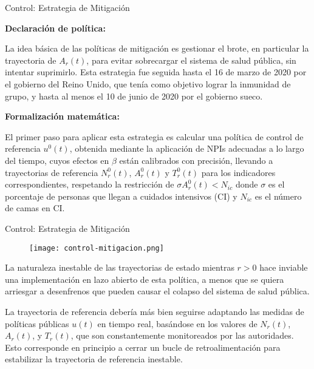 \documentclass{beamer}
\begin{document}
\begin{frame}{Control: Estrategia de Mitigación}
\begin{justify}
\small
\textbf{Declaración de política:}

\vspace{0.2cm}
La idea básica de las políticas de mitigación es gestionar el brote, en particular la trayectoria de \( A_r(t) \), para evitar sobrecargar el sistema de salud pública, sin intentar suprimirlo. Esta estrategia fue seguida hasta el 16 de marzo de 2020 por el gobierno del Reino Unido, que tenía como objetivo lograr la inmunidad de grupo, y hasta al menos el 10 de junio de 2020 por el gobierno sueco.

\vspace{0.3cm}
\textbf{Formalización matemática:}

\vspace{0.2cm}
El primer paso para aplicar esta estrategia es calcular una política de control de referencia \( u^0(t) \), obtenida mediante la aplicación de NPIs adecuadas a lo largo del tiempo, cuyos efectos en \( \beta \) están calibrados con precisión, llevando a trayectorias de referencia \( N_r^0(t) \), \( A_r^0(t) \) y \( T_r^0(t) \) para los indicadores correspondientes, respetando la restricción de \( \sigma A_r^0(t) < N_{ic} \) donde  $\sigma$ es el porcentaje de personas que llegan a cuidados intensivos (CI) y  $N_{ic}$ es el número de camas en CI. 


\end{justify}
\end{frame}

\begin{frame}{Control: Estrategia de Mitigación}
\begin{justify}
\small

\begin{figure}[H]
\centering
\texttt{[image: control-mitigacion.png]}
\captionsetup{justification=centering}
\label{C}
\end{figure}

La naturaleza inestable de las trayectorias de estado mientras \( r > 0 \) hace inviable una implementación en lazo abierto de esta política, a menos que se quiera arriesgar a desenfrenos que pueden causar el colapso del sistema de salud pública. 

\vspace{0.3cm}
La trayectoria de referencia debería más bien seguirse adaptando las medidas de políticas públicas \( u(t) \) en tiempo real, basándose en los valores de \( N_r(t) \), \( A_r(t) \), y \( T_r(t) \), que son constantemente monitoreados por las autoridades. Esto corresponde en principio a cerrar un bucle de retroalimentación para estabilizar la trayectoria de referencia inestable.

\end{justify}
\end{frame}
\end{document}
